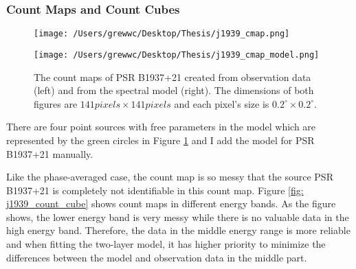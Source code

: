 \documentclass[12pt]{report}
\begin{document}
          \subsubsection{Count Maps and Count Cubes}
            \begin{figure}[!ht]
              \begin{center}
              \begin{minipage}{0.45\textwidth}
                \begin{center} 
                  \texttt{[image: /Users/grewwc/Desktop/Thesis/j1939\_cmap.png]}
                \end{center}
              \end{minipage}
              \begin{minipage}{0.45\textwidth}
                \begin{center}
                  \texttt{[image: /Users/grewwc/Desktop/Thesis/j1939\_cmap\_model.png]}
                \end{center}
              \end{minipage}
            \end{center}
 
          \caption{The count maps of PSR B1937+21 created from observation 
              data (\textsf{left}) and from the spectral model (\textsf{right}). The dimensions
              of both figures are $141 pixels \times 141 pixels$ and each pixel's size is
              $0.2^{\circ}\times0.2^{\circ}$.}
            \label{fig: j1939_count_map}
          \end{figure}

          There are four point sources with free parameters in the model which are represented 
          by the green circles in Figure \ref{fig: j1939_count_map} and I add the model for 
          PSR B1937+21 manually.  

          Like the phase-averaged case, the count map is so messy that the source PSR B1937+21 
          is completely not identifiable in this count map.  
          Figure \ref{fig: j1939_count_cube} shows count maps in different energy bands. As 
          the figure shows, the lower energy band is very messy while there is no valuable  
          data in the high energy band. Therefore, the data in the middle energy range is 
          more reliable and when fitting the two-layer model, it has higher priority to 
          minimize the differences between the model and observation data in the middle part.
\end{document}
